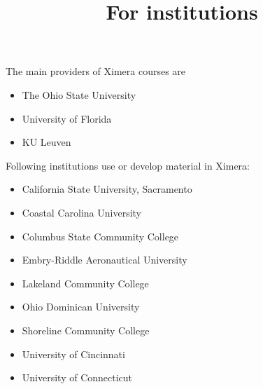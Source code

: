 \documentclass{ximera}
\title{For institutions}
\begin{document}
\begin{abstract}
\end{abstract}
\maketitle

The main providers of Ximera courses are
\begin{itemize}
    \item The Ohio State University
    \item University of Florida
    \item KU Leuven
\end{itemize}

Following institutions use or develop material in Ximera:

\begin{itemize}

    \item California State University, Sacramento
    \item Coastal Carolina University
    \item Columbus State Community College
    \item Embry-Riddle Aeronautical University
    \item Lakeland Community College
    \item Ohio Dominican University
    \item Shoreline Community College
    \item University of Cincinnati
    \item University of Connecticut

\end{itemize}
\end{document}
